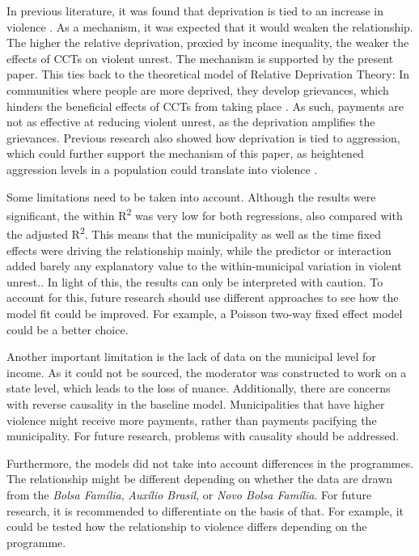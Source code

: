 \documentclass[stu,12pt]{apa7}
\begin{document}
In previous literature, it was found that deprivation is tied to an increase in violence \parencite{itskovichEconomicInequalityRelative2025}. As a mechanism, it was expected that it would weaken the relationship. The higher the relative deprivation, proxied by income inequality, the weaker the effects of CCTs on violent unrest. The mechanism is supported by the present paper. This ties back to the theoretical model of Relative Deprivation Theory: In communities where people are more deprived, they develop grievances, which hinders the beneficial effects of CCTs from taking place \parencite{smithRelativeDeprivationTheory2020}. As such, payments are not as effective at reducing violent unrest, as the deprivation amplifies the grievances. Previous research also showed how deprivation is tied to aggression, which could further support the mechanism of this paper, as heightened aggression levels in a population could translate into violence \parencite{greitemeyerImpactPersonalRelative2019}.

Some limitations need to be taken into account. Although the results were significant, the within R\textsuperscript{2} was very low for both regressions, also compared with the adjusted R\textsuperscript{2}. This means that the municipality as well as the time fixed effects were driving the relationship mainly, while the predictor or interaction added barely any explanatory value to the within-municipal variation in violent unrest.. In light of this, the results can only be interpreted with caution. To account for this, future research should use different approaches to see how the model fit could be improved. For example, a Poisson two-way fixed effect model could be a better choice.

Another important limitation is the lack of data on the municipal level for income. As it could not be sourced, the moderator was constructed to work on a state level, which leads to the loss of nuance. Additionally, there are concerns with reverse causality in the baseline model. Municipalities that have higher violence might receive more payments, rather than payments pacifying the municipality. For future research, problems with causality should be addressed.

Furthermore, the models did not take into account differences in the programmes. The relationship might be different depending on whether the data are drawn from the \textit{Bolsa Família}, \textit{Auxílio Brasil}, or \textit{Novo Bolsa Família}. For future research, it is recommended to differentiate on the basis of that. For example, it could be tested how the relationship to violence differs depending on the programme.
\end{document}
